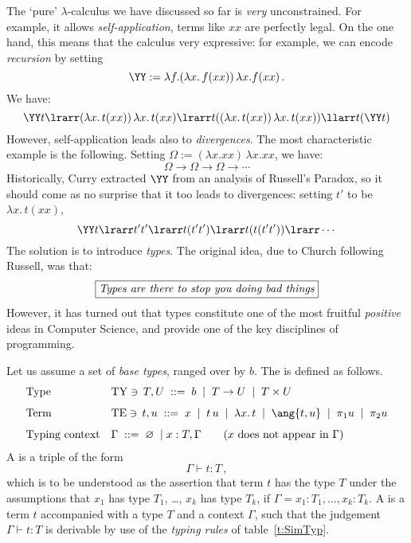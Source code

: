 \documentclass[12pt]{article}
\begin{document}
The `pure' $\lambda$-calculus we have discussed so far is \emph{very} unconstrained. For example, it allows \emph{self-application}, \ie terms like $xx$ are perfectly legal. On the one hand, this means that the calculus very expressive: for example, we can encode \emph{recursion} by setting
\[ \YY := \lambda f.  (\lambda x. \, f(x x))\,\lambda x.  f(x x)\,. \]
We have:
\[ \YY t \lrarr (\lambda x. \, t(x x)) \,\lambda x. \, t(x x) \lrarr t ((\lambda x. \, t(x x))\,\lambda x. \, t(x x)) \llarr t(\YY t) \]
%
However, self-application leads also to \emph{divergences}. The most characteristic example is the following. Setting $\Omega :=(\lambda x.xx)\,\lambda x.xx$, we have:
\[ \Omega \longrightarrow \Omega \longrightarrow \Omega \longrightarrow \cdots \]
Historically, Curry extracted $\YY$ from an analysis of Russell's Paradox, so it should come as no surprise that it too leads to divergences:
setting $t'$ to be $\lambda x. \, t(x x)$,
\[ \YY t \lrarr t't' \lrarr t(t't')\lrarr t(t(t't')) \lrarr \cdots \]
%
The solution is to introduce \emph{types}.  The original idea, due to Church following Russell, was that:
\[ \fbox{\textit{Types are there to stop you doing bad things}} \]
However, it has turned out that types constitute one of the most fruitful \emph{positive} ideas in Computer Science, and provide  one of the
key disciplines of programming.
%
\begin{mydefinition}
Let us assume a set of \emph{base types}, ranged over by $b$. The  is defined as follows.
\begin{align*}
&\text{Type} &&
\mathrm{TY}\ni\, T,U \; ::= \; b \; \mid \; T \rightarrow U \; \mid \; T \times U %
\\[1.5mm]
&\text{Term} && \mathrm{TE}\ni\,t,u\; ::= \; x \; \mid \; {t\,u} \;\mid\; {\lambda x.\, t} \;\mid\; \ang{t,u} \;\mid\; \pi_1u \;\mid\; \pi_2u \\[1.5mm]
&\text{Typing context} && \Gamma \;::=\; \varnothing\; \mid x : T,\Gamma \qquad(x\text{ does not appear in }\Gamma)
\end{align*}
A  is a triple of the form
\[ \Gamma \vdash t : T\,, \]
which is to be understood as the assertion that term $t$ has the type $T$ under the assumptions that $x_{1}$ has type $T_{1}$, \ldots , $x_{k}$ has type $T_{k}$, if $\Gamma = x_{1}:T_{1}, \ldots , x_{k} : T_{k}$. A  is a term $t$ accompanied with a type $T$ and a context $\Gamma$, such that the judgement $\Gamma\vdash t:T$ is derivable by use of the \emph{typing rules} of table~\ref{t:SimTyp}.
\deq
\end{mydefinition}
\end{document}
